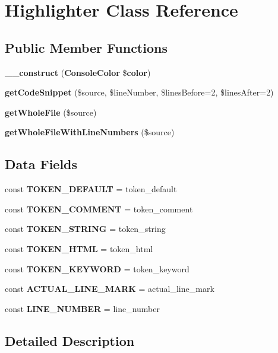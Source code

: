 \section{Highlighter Class Reference}
\label{class_jakub_onderka_1_1_php_console_highlighter_1_1_highlighter}
\subsection*{Public Member Functions}
\begin{DoxyCompactItemize}
\item 
{\bf \+\_\+\+\_\+construct} ({\bf Console\+Color} \${\bf color})
\item 
{\bf get\+Code\+Snippet} (\$source, \$line\+Number, \$lines\+Before=2, \$lines\+After=2)
\item 
{\bf get\+Whole\+File} (\$source)
\item 
{\bf get\+Whole\+File\+With\+Line\+Numbers} (\$source)
\end{DoxyCompactItemize}
\subsection*{Data Fields}
\begin{DoxyCompactItemize}
\item 
const {\bf T\+O\+K\+E\+N\+\_\+\+D\+E\+F\+A\+U\+L\+T} = \textquotesingle{}token\+\_\+default\textquotesingle{}
\item 
const {\bf T\+O\+K\+E\+N\+\_\+\+C\+O\+M\+M\+E\+N\+T} = \textquotesingle{}token\+\_\+comment\textquotesingle{}
\item 
const {\bf T\+O\+K\+E\+N\+\_\+\+S\+T\+R\+I\+N\+G} = \textquotesingle{}token\+\_\+string\textquotesingle{}
\item 
const {\bf T\+O\+K\+E\+N\+\_\+\+H\+T\+M\+L} = \textquotesingle{}token\+\_\+html\textquotesingle{}
\item 
const {\bf T\+O\+K\+E\+N\+\_\+\+K\+E\+Y\+W\+O\+R\+D} = \textquotesingle{}token\+\_\+keyword\textquotesingle{}
\item 
const {\bf A\+C\+T\+U\+A\+L\+\_\+\+L\+I\+N\+E\+\_\+\+M\+A\+R\+K} = \textquotesingle{}actual\+\_\+line\+\_\+mark\textquotesingle{}
\item 
const {\bf L\+I\+N\+E\+\_\+\+N\+U\+M\+B\+E\+R} = \textquotesingle{}line\+\_\+number\textquotesingle{}
\end{DoxyCompactItemize}


\subsection{Detailed Description}


